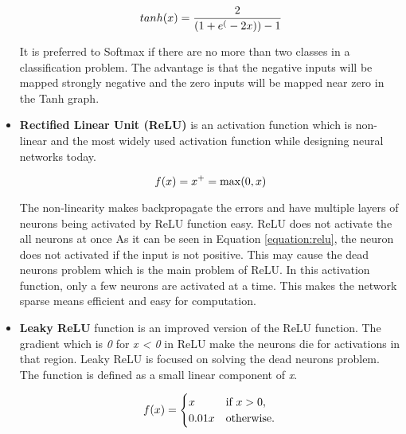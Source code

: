 \begin{itemize}
                    \begin{equation}
                        tanh(x) = \frac{2}{(1+e^(-2x)) -1} \label{equation:tanh} \\
                    \end{equation}

                    It is preferred to Softmax if there are no more than two classes in a classification problem.
                    The advantage is that the negative inputs will be mapped strongly negative and the zero inputs will be mapped near zero in the Tanh graph.

            \item \textbf{Rectified Linear Unit (ReLU)} is an activation function which is non-linear and the most widely used activation function while designing neural networks today.

                    \begin{equation}
                          f(x) = x^+ = \max(0, x) \label{equation:relu} \\
                    \end{equation}

                    The non-linearity makes backpropagate the errors and have multiple layers of neurons being activated by ReLU function easy.
                    ReLU does not activate the all neurons at once
                    As it can be seen in Equation \eqref{equation:relu}, the neuron does not activated if the input is not positive.
                    This may cause the dead neurons problem which is the main problem of ReLU.
                    In this activation function, only a few neurons are activated at a time. This makes the network sparse means efficient and easy for computation.

            \item \textbf{Leaky ReLU} function is an improved version of the ReLU function.
                    The gradient which is \emph{0} for \emph{x < 0} in ReLU make the neurons die for activations in that region.
                    Leaky ReLU is focused on solving the dead neurons problem.
                    The function is defined as a small linear component of \emph{x}.

                    \begin{equation}
                         f(x) = \begin{cases} x &
                            \text{if } x > 0, \\
                            0.01x & \text{otherwise}.
                         \end{cases}\\
                    \end{equation}


\end{itemize}
